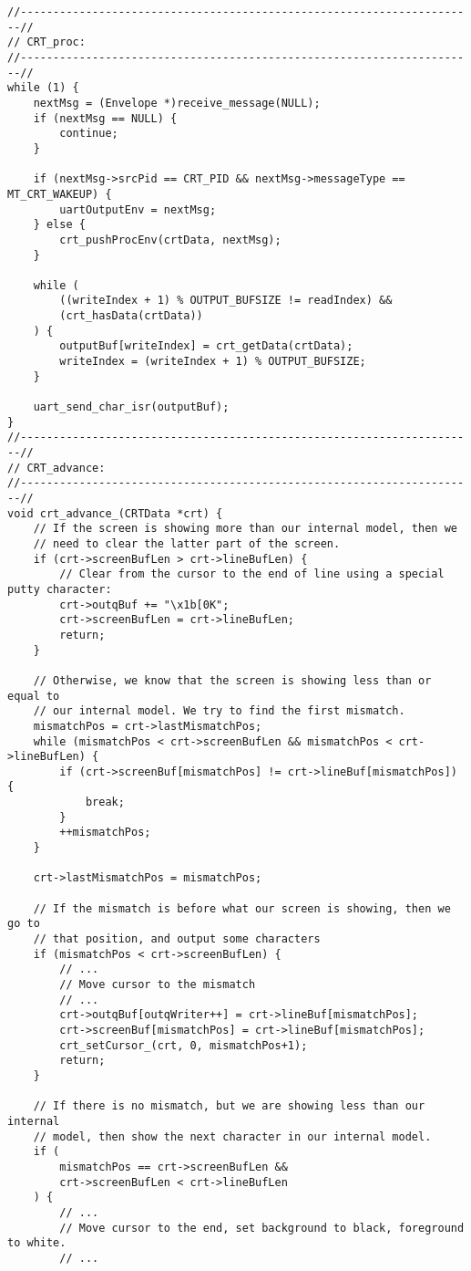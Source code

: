 \documentclass[12pt]{report}
\begin{document}
\label{code:uart_output}
\begin{lstlisting}
//----------------------------------------------------------------------//
// CRT_proc:
//----------------------------------------------------------------------//
while (1) {
    nextMsg = (Envelope *)receive_message(NULL);
    if (nextMsg == NULL) {
        continue;
    }

    if (nextMsg->srcPid == CRT_PID && nextMsg->messageType == MT_CRT_WAKEUP) {
        uartOutputEnv = nextMsg;
    } else {
        crt_pushProcEnv(crtData, nextMsg);
    }

    while (
        ((writeIndex + 1) % OUTPUT_BUFSIZE != readIndex) &&
        (crt_hasData(crtData))
    ) {
        outputBuf[writeIndex] = crt_getData(crtData);
        writeIndex = (writeIndex + 1) % OUTPUT_BUFSIZE;
    }

    uart_send_char_isr(outputBuf);
}
//----------------------------------------------------------------------//
// CRT_advance:
//----------------------------------------------------------------------//
void crt_advance_(CRTData *crt) {
    // If the screen is showing more than our internal model, then we
    // need to clear the latter part of the screen.
    if (crt->screenBufLen > crt->lineBufLen) {
        // Clear from the cursor to the end of line using a special putty character:
        crt->outqBuf += "\x1b[0K";
        crt->screenBufLen = crt->lineBufLen;
        return;
    }

    // Otherwise, we know that the screen is showing less than or equal to
    // our internal model. We try to find the first mismatch.
    mismatchPos = crt->lastMismatchPos;
    while (mismatchPos < crt->screenBufLen && mismatchPos < crt->lineBufLen) {
        if (crt->screenBuf[mismatchPos] != crt->lineBuf[mismatchPos]) {
            break;
        }
        ++mismatchPos;
    }

    crt->lastMismatchPos = mismatchPos;

    // If the mismatch is before what our screen is showing, then we go to
    // that position, and output some characters
    if (mismatchPos < crt->screenBufLen) {
        // ...
        // Move cursor to the mismatch
        // ...
        crt->outqBuf[outqWriter++] = crt->lineBuf[mismatchPos];
        crt->screenBuf[mismatchPos] = crt->lineBuf[mismatchPos];
        crt_setCursor_(crt, 0, mismatchPos+1);
        return;
    }

    // If there is no mismatch, but we are showing less than our internal
    // model, then show the next character in our internal model.
    if (
        mismatchPos == crt->screenBufLen &&
        crt->screenBufLen < crt->lineBufLen
    ) {
        // ...
        // Move cursor to the end, set background to black, foreground to white.
        // ...


\end{lstlisting}
\end{document}
